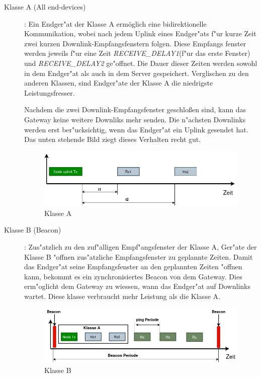 \begin{description}
	\item [Klasse A (All end-devices) \label{classA}]: Ein Endger"at der Klasse A ermöglich eine bidirektionelle Kommunikation, wobei nach jedem Uplink eines Endger"ats f"ur kurze Zeit zwei kurzen Downlink-Empfangsfenstern folgen. Diese Empfangs fenster werden jeweils f"ur eine Zeit \textit{RECEIVE\_DELAY1}(f"ur das erste Fenster) und \textit{RECEIVE\_DELAY2} ge"offnet. Die Dauer dieser Zeiten werden sowohl in dem Endger"at als auch in dem Server gespeichert. Verglischen zu den anderen Klassen, sind Endger"ate der Klasse A die niedrigste Leistungsfresser. 
	
	Nachdem die zwei Downlink-Empfangsfenster geschlo\ss{}en sind, kann das Gateway keine weitere Downliks mehr senden. Die n"achsten Downlinks werden erst ber"ucksichtig, wenn das Endger"at ein Uplink gesendet hat.
	Das unten stehende Bild ziegt dieses Verhalten recht gut.
	
	 \begin{figure}[h]
	 	\centering
	 	\includegraphics[width=14cm]{source/images/ClassA}
	 	\caption{Klasse A \label{fig:classA}}
	 \end{figure}
	
	\item [Klasse B (Beacon)]: Zus"atzlich zu den zuf"alligen Empf"angsfenster der Klasse A, Ger"ate der Klasse B "offnen zus"atzliche Empfangsfenster zu geplannte Zeiten. Damit das Endger"at seine Empfangsfenster an den geplannten Zeiten "offnen kann, bekommt es  ein zynchronisiertes Beacon von dem Gateway. Dies erm"oglicht dem Gateway zu wiessen, wann das Endger"at auf Downlinks wartet. Diese klasse verbraucht mehr Leistung als die Klasse A. 
	
	 \begin{figure}[h]
		\centering
		\includegraphics[width=14cm]{source/images/ClassB}
		\caption{Klasse B \label{fig:classB}}
	\end{figure}
	

\end{description}
